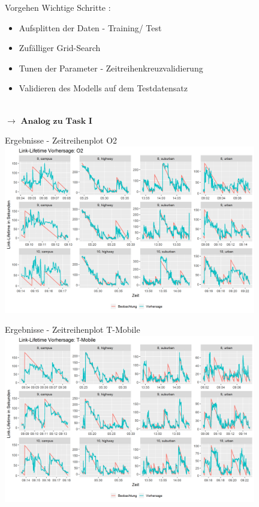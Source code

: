 \begin{frame}{Vorgehen}
Wichtige Schritte : 
	\begin{itemize}
		\item Aufsplitten der Daten - Training/ Test
		\item Zufälliger Grid-Search
		\item Tunen der Parameter - Zeitreihenkreuzvalidierung
		\item Validieren des Modells auf dem Testdatensatz 
	\end{itemize}

\quad\\


$\rightarrow$ $\textbf{Analog zu Task I}$
\end{frame}





\begin{frame}{Ergebnisse - Zeitreihenplot O2}
\includegraphics[width = 11cm]{plots/link_lifetime/o2_predictions}
\end{frame}


\begin{frame}{Ergebnisse - Zeitreihenplot T-Mobile}
\includegraphics[width = 11cm]{plots/link_lifetime/tmobile_predictions}
\end{frame}


